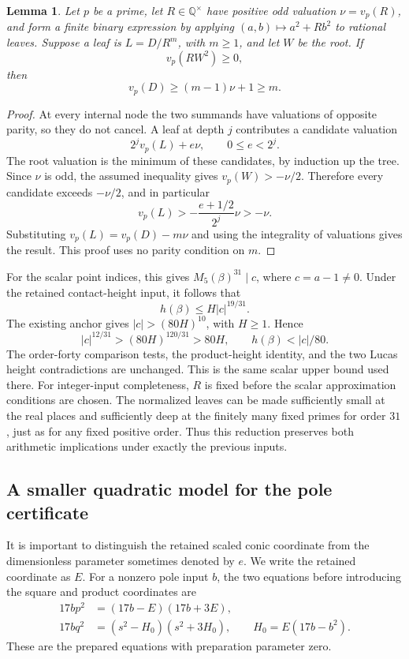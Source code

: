 \documentclass[11pt,a4paper]{article}
\newtheorem{lemma}[theorem]{Lemma}
\theoremstyle{definition}
\theoremstyle{remark}
\begin{document}
\begin{lemma}\label{q456:arbitrary-scalar-order}
Let $p$ be a prime, let $R\in\mathbb Q^\times$ have positive odd
valuation $\nu=v_p(R)$, and form a finite binary expression by applying
$(a,b)\mapsto a^2+Rb^2$ to rational leaves. Suppose a leaf is
$L=D/R^m$, with $m\ge1$, and let $W$ be the root. If
\[
                              v_p(RW^2)\ge0,
\]
then
\[
                       v_p(D)\ge(m-1)\nu+1\ge m.
\]
\end{lemma}
\begin{proof}
At every internal node the two summands have valuations of opposite
parity, so they do not cancel. A leaf at depth $j$ contributes a
candidate valuation
\[
                             2^jv_p(L)+e\nu,
                         \qquad 0\le e<2^j.
\]
The root valuation is the minimum of these candidates, by induction
up the tree. Since $\nu$ is odd, the assumed inequality gives
$v_p(W)>-\nu/2$. Therefore every candidate exceeds $-\nu/2$,
and in particular
\[
 v_p(L)>-\frac{e+1/2}{2^j}\nu>-\nu.
\]
Substituting $v_p(L)=v_p(D)-m\nu$ and using the integrality of
valuations gives the result. This proof uses no parity condition on $m$.
\end{proof}

For the scalar point indices, this gives
$M_5(\beta)^{31}\mid c$, where $c=a-1\ne0$. Under the retained
contact-height input, it follows that
\[
                            h(\beta)\le H|c|^{19/31}.
\]
The existing anchor gives $|c|>(80H)^{10}$, with $H\ge1$. Hence
\[
 |c|^{12/31}>(80H)^{120/31}>80H,
 \qquad h(\beta)<|c|/80.
\]
The order-forty comparison tests, the product-height identity, and
the two Lucas height contradictions are unchanged. This is the same
scalar upper bound used there. For integer-input completeness, $R$ is
fixed before the scalar approximation conditions are chosen. The
normalized leaves can be made sufficiently small at the real places
and sufficiently deep at the finitely many fixed primes for order $31$,
just as for any fixed positive order. Thus this reduction preserves
both arithmetic implications under exactly the previous inputs.

\subsection{A smaller quadratic model for the pole certificate}

It is important to distinguish the retained scaled conic coordinate
from the dimensionless parameter sometimes denoted by $e$. We write
the retained coordinate as $E$. For a nonzero pole input $b$, the two
equations before introducing the square and product coordinates are
\begin{equation}\label{q456:old-poles}
 \begin{split}
 17b p^2&=(17b-E)(17b+3E),\\
 17b q^2&=(s^2-H_0)(s^2+3H_0),
       \qquad H_0=E(17b-b^2).
 \end{split}
\end{equation}
These are the prepared equations with preparation parameter zero.
\end{document}
